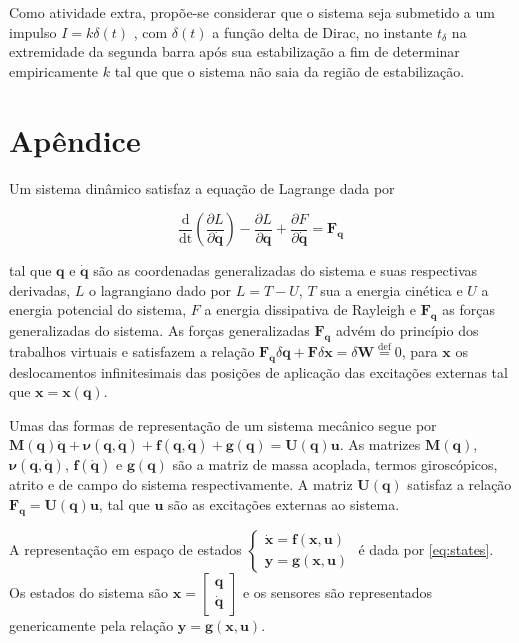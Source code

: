\documentclass[a4paper, twoside, fleqn]{article}
\begin{document}
    Como atividade extra, propõe-se considerar que o sistema seja submetido a um impulso $I = k \delta(t)$ \cite{Beer:2003:VME:1207649}, com $\delta(t)$ a função delta de Dirac, no instante $t_{\delta}$ na extremidade da segunda barra após sua estabilização a fim de determinar empiricamente $k$ tal que que o sistema não saia da região de estabilização.  

\newpage

\section*{Apêndice}

Um sistema dinâmico satisfaz a equação de Lagrange dada por 

\begin{equation}
    \frac{\mathrm{d}}{\mathrm{dt}} \left( \frac{\partial L}{\partial \mathbf{\dot q}} \right) - \frac{\partial L}{\partial \mathbf{q}} + \frac{\partial F}{\partial \mathbf{\dot q}} = \mathbf{F_q}
\end{equation}

    tal que $\mathbf{q}$ e $\mathbf{\dot q}$ são as coordenadas generalizadas do sistema e suas respectivas derivadas, $L$ o lagrangiano dado por $L = T - U$, $T$ sua a energia cinética e $U$ a energia potencial do sistema, $F$ a energia dissipativa de Rayleigh e $\mathbf{F_q}$ as forças generalizadas do sistema. As forças generalizadas $\mathbf{F_q}$ advém do princípio dos trabalhos virtuais \cite{Beer:2003:VME:1207649} e satisfazem a relação $\mathbf{F_q} \delta{\mathbf{q}} + \mathbf{F}\delta \mathbf{x} = \delta \mathbf{W} \stackrel{\mathrm{def}}{=} 0$, para $\mathbf{x}$ os deslocamentos infinitesimais das posições de aplicação das excitações externas tal que $\mathbf{x} = \mathbf{x}(\mathbf{q})$.
    
    Umas das formas de representação de um sistema mecânico segue por $\mathbf{M}(\mathbf{q}) \mathbf{\ddot q} + \mathbf{\nu}(\mathbf{q}, \mathbf{\dot q}) + \mathbf{f}(\mathbf{q}, \mathbf{\dot q}) + \mathbf{g}(\mathbf{q}) = \mathbf{U}(\mathbf{q}) \mathbf{u}$. As matrizes $\mathbf{M}(\mathbf{q})$, $\mathbf{\nu(\mathbf{q}, \mathbf{\dot q})}$, $\mathbf{f}(\mathbf{\dot q})$ e $\mathbf{g}(\mathbf{q})$ são a matriz de massa acoplada, termos giroscópicos, atrito e de campo do sistema respectivamente. A matriz $\mathbf{U}(\mathbf{q})$ satisfaz a relação $\mathbf{F_q} = \mathbf{U}(\mathbf{q})\mathbf{u}$, tal que $\mathbf{u}$ são as excitações externas ao sistema.

    A representação em espaço de estados $\begin{cases} \mathbf{\dot x} = \mathbf{f}(\mathbf{x}, \mathbf{u}) \\ \mathbf{y} = \mathbf{g}(\mathbf{x}, \mathbf{u}) \end{cases}$ é dada por \eqref{eq:states}. Os estados do sistema são $\mathbf{x} = \begin{bmatrix} \mathbf{q} \\ \mathbf{\dot q} \end{bmatrix}$ e os sensores são representados genericamente pela relação $\mathbf{y} = \mathbf{g}(\mathbf{x}, \mathbf{u})$.
    
\end{document}
